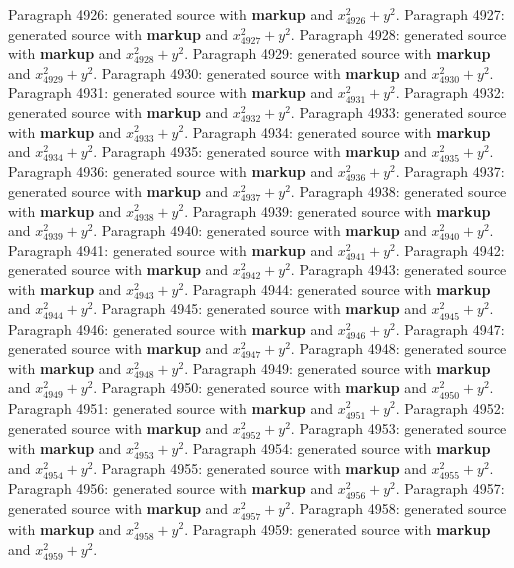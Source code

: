 \documentclass{article}
\begin{document}
Paragraph 4926: generated source with \textbf{markup} and $x_{4926}^2 + y^2$.
Paragraph 4927: generated source with \textbf{markup} and $x_{4927}^2 + y^2$.
Paragraph 4928: generated source with \textbf{markup} and $x_{4928}^2 + y^2$.
Paragraph 4929: generated source with \textbf{markup} and $x_{4929}^2 + y^2$.
Paragraph 4930: generated source with \textbf{markup} and $x_{4930}^2 + y^2$.
Paragraph 4931: generated source with \textbf{markup} and $x_{4931}^2 + y^2$.
Paragraph 4932: generated source with \textbf{markup} and $x_{4932}^2 + y^2$.
Paragraph 4933: generated source with \textbf{markup} and $x_{4933}^2 + y^2$.
Paragraph 4934: generated source with \textbf{markup} and $x_{4934}^2 + y^2$.
Paragraph 4935: generated source with \textbf{markup} and $x_{4935}^2 + y^2$.
Paragraph 4936: generated source with \textbf{markup} and $x_{4936}^2 + y^2$.
Paragraph 4937: generated source with \textbf{markup} and $x_{4937}^2 + y^2$.
Paragraph 4938: generated source with \textbf{markup} and $x_{4938}^2 + y^2$.
Paragraph 4939: generated source with \textbf{markup} and $x_{4939}^2 + y^2$.
Paragraph 4940: generated source with \textbf{markup} and $x_{4940}^2 + y^2$.
Paragraph 4941: generated source with \textbf{markup} and $x_{4941}^2 + y^2$.
Paragraph 4942: generated source with \textbf{markup} and $x_{4942}^2 + y^2$.
Paragraph 4943: generated source with \textbf{markup} and $x_{4943}^2 + y^2$.
Paragraph 4944: generated source with \textbf{markup} and $x_{4944}^2 + y^2$.
Paragraph 4945: generated source with \textbf{markup} and $x_{4945}^2 + y^2$.
Paragraph 4946: generated source with \textbf{markup} and $x_{4946}^2 + y^2$.
Paragraph 4947: generated source with \textbf{markup} and $x_{4947}^2 + y^2$.
Paragraph 4948: generated source with \textbf{markup} and $x_{4948}^2 + y^2$.
Paragraph 4949: generated source with \textbf{markup} and $x_{4949}^2 + y^2$.
Paragraph 4950: generated source with \textbf{markup} and $x_{4950}^2 + y^2$.
Paragraph 4951: generated source with \textbf{markup} and $x_{4951}^2 + y^2$.
Paragraph 4952: generated source with \textbf{markup} and $x_{4952}^2 + y^2$.
Paragraph 4953: generated source with \textbf{markup} and $x_{4953}^2 + y^2$.
Paragraph 4954: generated source with \textbf{markup} and $x_{4954}^2 + y^2$.
Paragraph 4955: generated source with \textbf{markup} and $x_{4955}^2 + y^2$.
Paragraph 4956: generated source with \textbf{markup} and $x_{4956}^2 + y^2$.
Paragraph 4957: generated source with \textbf{markup} and $x_{4957}^2 + y^2$.
Paragraph 4958: generated source with \textbf{markup} and $x_{4958}^2 + y^2$.
Paragraph 4959: generated source with \textbf{markup} and $x_{4959}^2 + y^2$.
\end{document}

